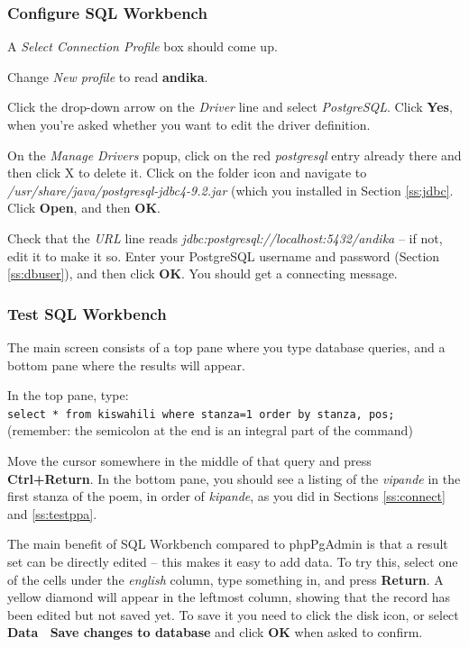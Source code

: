 \documentclass[a4paper,10pt, oneside]{book}
\begin{document}
\subsubsection{Configure SQL Workbench}

A \textit{Select Connection Profile} box should come up. 

Change \textit{New profile} to read \textbf{andika}.

Click the drop-down arrow on the \textit{Driver} line and select \textit{PostgreSQL}. Click \textbf{Yes}, when you're asked whether you want to edit the driver definition.

On the \textit{Manage Drivers} popup, click on the red \textit{postgresql} entry already there and then click X to delete it.  Click on the folder icon and navigate to \textit{/usr/share/java/postgresql-jdbc4-9.2.jar} (which you installed in Section \ref{ss:jdbc}.  Click \textbf{Open}, and then \textbf{OK}.

Check that the \textit{URL} line reads \textit{jdbc:postgresql://localhost:5432/andika} -- if not, edit it to make it so. Enter your PostgreSQL username and password (Section \ref{ss:dbuser}), and then click \textbf{OK}.  You should get a connecting message.

\subsubsection{Test SQL Workbench}

The main screen consists of a top pane where you type database queries, and a bottom pane where the results will appear. 

In the top pane, type:\\
\verb|select * from kiswahili where stanza=1 order by stanza, pos;|\\
(remember: the semicolon at the end is an integral part of the command)

Move the cursor somewhere in the middle of that query and press \textbf{Ctrl+Return}.  In the bottom pane, you should see a listing of the \textit{vipande} in the first stanza of the poem, in order of \textit{kipande}, as you did in Sections \ref{ss:connect} and \ref{ss:testppa}.

The main benefit of SQL Workbench compared to phpPgAdmin is that a result set can be directly edited -- this makes it easy to add data.  To try this, select one of the cells under the \textit{english} column, type something in, and press \textbf{Return}.  A yellow diamond will appear in the leftmost column, showing that the record has been edited but not saved yet. To save it you need to click the disk icon, or select \textbf{Data \textrightarrow\ Save changes to database} and click \textbf{OK} when asked to confirm.
\end{document}
